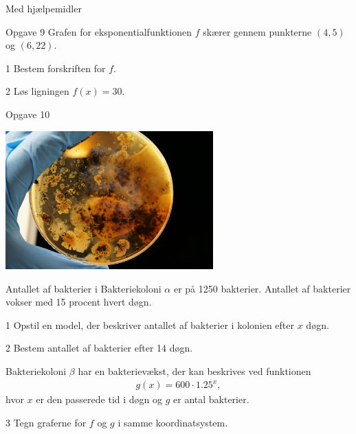 \newpage

\begin{center}
	\LARGE
	Med hjælpemidler
\end{center}

\begin{opgavetekst}{Opgave 9}
	Grafen for eksponentialfunktionen $f$ skærer gennem punkterne $(4,5)$ og $(6,22)$.
\end{opgavetekst}
\begin{delopgave}{}{1}
	Bestem forskriften for $f$. 
\end{delopgave}
\begin{delopgave}{}{2}
	Løs ligningen $f(x) = 30$. 
\end{delopgave}

\begin{opgavetekst}{Opgave 10}
	\begin{center}
		\includegraphics[width= 0.6\textwidth]{Billeder/Bakterie}
	\end{center}
	Antallet af bakterier i Bakteriekoloni $\alpha$ er på 1250 bakterier. Antallet af bakterier vokser med 15 procent hvert døgn.
\end{opgavetekst}
\begin{delopgave}{}{1}
	Opstil en model, der beskriver antallet af bakterier i kolonien efter $x$ døgn. 
\end{delopgave}
\begin{delopgave}{}{2}
	Bestem antallet af bakterier efter 14 døgn. 
\end{delopgave}
\begin{meretekst}
	Bakteriekoloni $\beta$ har en bakterievækst, der kan beskrives ved funktionen
	\begin{align*}
		g(x) = 600\cdot 1.25^x,
	\end{align*}
	hvor $x$ er den passerede tid i døgn og $g$ er antal bakterier. 
\end{meretekst}
\begin{delopgave}{}{3}
	Tegn graferne for $f$ og $g$ i samme koordinatsystem.
\end{delopgave}


